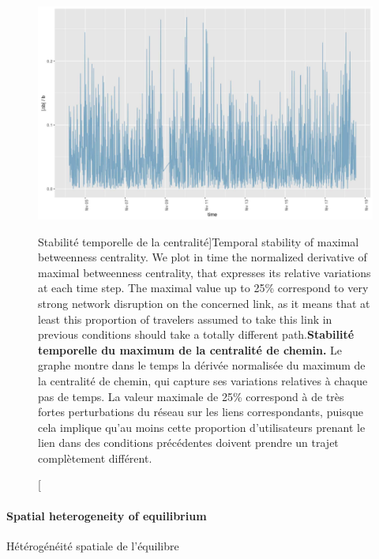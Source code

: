 \begin{figure}
\includegraphics[width=\linewidth]{Figures/Final/8-1-2-fig-transportationequilibrium-fig-4.jpg}
\caption[Temporal stability of maximal betweenness centrality][Stabilité temporelle de la centralité]{Temporal stability of maximal betweenness centrality. We plot in time the normalized derivative of maximal betweenness centrality, that expresses its relative variations at each time step. The maximal value up to 25\% correspond to very strong network disruption on the concerned link, as it means that at least this proportion of travelers assumed to take this link in previous conditions should take a totally different path.\label{fig:transportationequilibrium:fig-4}}{\textbf{Stabilité temporelle du maximum de la centralité de chemin.} Le graphe montre dans le temps la dérivée normalisée du maximum de la centralité de chemin, qui capture ses variations relatives à chaque pas de temps. La valeur maximale de 25\% correspond à de très fortes perturbations du réseau sur les liens correspondants, puisque cela implique qu'au moins cette proportion d'utilisateurs prenant le lien dans des conditions précédentes doivent prendre un trajet complètement différent.\label{fig:transportationequilibrium:fig-4}}
\end{figure}




\paragraph{Spatial heterogeneity of equilibrium}{Hétérogénéité spatiale de l'équilibre}



